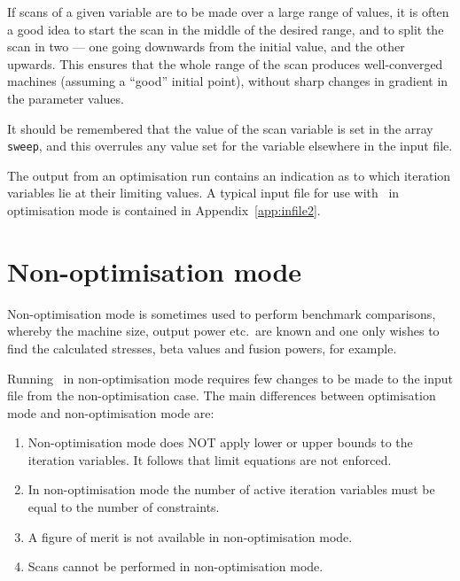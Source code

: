 If scans of a given variable are to be made over a large range of
values, it is often a good idea to start the scan in the middle of the desired
range, and to split the scan in two --- one going downwards from the initial
value, and the other upwards.  This ensures that the whole range of the scan
produces well-converged machines (assuming a ``good'' initial point), without
sharp changes in gradient in the parameter values.

It should be remembered that the value of the scan variable is set in the
array \texttt{sweep}, and this overrules any value set for the variable
elsewhere in the input file.

The output from an optimisation run contains an indication as to which iteration variables lie at their limiting values. A typical input file for use with \process\ in optimisation mode is contained in Appendix~\ref{app:infile2}.

\section{Non-optimisation mode}
\label{sec:optim}

Non-optimisation mode is sometimes used to perform benchmark comparisons, whereby the
machine size, output power etc.\ are known and one only wishes to find the
calculated stresses, beta values and fusion powers, for example.

Running \process\ in non-optimisation mode requires few changes to be made to the
input file from the non-optimisation case. The main differences between
optimisation mode and non-optimisation mode are:

\begin{enumerate}

\item Non-optimisation mode does NOT apply lower or upper bounds to the iteration
  variables.  It follows that limit equations are not enforced.

\item In non-optimisation mode the number of active iteration variables must be equal to the number of constraints.

\item A figure of merit is not available in non-optimisation mode.

\item Scans cannot be performed in non-optimisation mode.

\end{enumerate}

